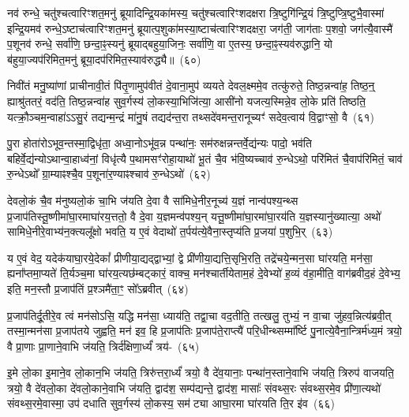 नव॑ रुन्धे॒ चतु॑श्चत्वारिꣳशत॒मनु॑ ब्रूयादिन्द्रि॒यका॑मस्य॒ चतु॑श्चत्वारिꣳशदक्षरा त्रि॒ष्टुगि॑न्द्रि॒यं त्रि॒ष्टुप्त्रि॒ष्टुभै॒वास्मा॑ इन्द्रि॒यमव॑ रुन्धे॒\-ऽष्टाच॑त्वारिꣳशत॒मनु॑ ब्रूयात्प॒शुका॑मस्या॒ष्टाच॑त्वारिꣳशदक्षरा॒ जग॑ती॒ जाग॑ताः प॒शवो॒ जग॑त्यै॒वास्मै॑ प॒शूनव॑ रुन्धे॒ सर्वा॑णि॒ छन्दा॒ꣴ॒स्यनु॑ ब्रूयाद्बहुया॒जिनः॒ सर्वा॑णि॒ वा ए॒तस्य॒ छन्दा॒ꣴ॒स्यव॑रुद्धानि॒ यो ब॑हुया॒ज्यप॑रिमित॒मनु॑ ब्रूया॒दप॑रिमित॒स्याव॑रुद्ध्यै॥~(६०)

{\anuvakamend[{का॒मये॑त॒ प्रति॑ष्ठित्यै प॒शून्थ्स॒प्तच॑त्वारिꣳशच्च}]}%

निवी॑तं मनु॒ष्या॑णां प्राचीनावी॒तं पि॑तृ॒णामुप॑वीतं दे॒वाना॒मुप॑ व्ययते देवल॒क्ष्ममे॒व तत्कु॑रुते॒ तिष्ठ॒न्नन्वा॑ह॒ तिष्ठ॒न्॒ ह्याश्रु॑ततरं॒ वद॑ति॒ तिष्ठ॒न्नन्वा॑ह सुव॒र्गस्य॑ लो॒कस्या॒भिजि॑त्या॒ आसी॑नो यजत्य॒स्मिन्ने॒व लो॒के प्रति॑ तिष्ठति॒ यत्क्रौ॒ञ्चम॒न्वाहा॑ऽऽसु॒रं तद्यन्म॒न्द्रं मा॑नु॒षं तद्यद॑न्त॒रा तथ्सदे॑वमन्त॒रानूच्यꣳ॑ सदेव॒त्वाय॑ वि॒द्वाꣳसो॒ वै~(६१)

पु॒रा होता॑रो\-ऽभूव॒न्तस्मा॒द्विधृ॑ता॒ अध्वा॒नो\-ऽभू॑व॒न्न पन्था॑नः॒ सम॑रुक्षन्नन्तर्वे॒द्य॑न्यः पादो॒ भव॑ति बहिर्वे॒द्य॑न्यो\-ऽथान्वा॒हाध्व॑नां॒ विधृ॑त्यै प॒थामसꣳ॑रोहा॒याथो॑ भू॒तं चै॒व भ॑वि॒ष्यच्चाव॑ रु॒न्धे\-ऽथो॒ परि॑मितं चै॒वाप॑रिमितं॒ चाव॑ रु॒न्धे\-ऽथो᳚ ग्रा॒म्याꣴश्चै॒व प॒शूना॑र॒ण्याꣴश्चाव॑ रु॒न्धे\-ऽथो॑~(६२)

देवलो॒कं चै॒व म॑नुष्यलो॒कं चा॒भि ज॑यति दे॒वा वै सा॑मिधे॒नीर॒नूच्य॑ य॒ज्ञं नान्व॑पश्य॒न्थ्स प्र॒जा\-प॑तिस्तू॒ष्णीमा॑घा॒र\-माघा॑र\-य॒त्ततो॒ वै दे॒वा य॒ज्ञमन्व॑पश्य॒न् यत्तू॒ष्णीमा॑\-घा॒रमा॑\-घा॒रय॑ति य॒ज्ञस्यानु॑\-ख्यात्या॒ अथो॑ सामिधे॒नीरे॒वाभ्य॑न॒क्त्यलू᳚क्षो भवति॒ य ए॒वं वेदाथो॑ त॒र्पय॑त्ये॒वैना॒स्तृप्य॑ति प्र॒जया॑ प॒शुभि॒र्~(६३)

य ए॒वं वेद॒ यदेक॑याघा॒रये॒देकां᳚ प्रीणीया॒द्यद्द्वाभ्यां॒ द्वे प्री॑णीया॒द्यत्ति॒सृभि॒रति॒ तद्रे॑चये॒न्मन॒सा घा॑रयति॒ मन॑सा॒ ह्यना᳚प्तमा॒प्यते॑ ति॒र्यञ्च॒मा घा॑रय॒त्यछ॑म्बट्कारं॒ वाक्च॒ मन॑श्चार्तीयेताम॒हं दे॒वेभ्यो॑ ह॒व्यं व॑हा॒मीति॒ वाग॑ब्रवीद॒हं दे॒वेभ्य॒ इति॒ मन॒स्तौ प्र॒जा\-प॑तिं प्र॒श्ञमै॑ता॒ꣳ॒ सो᳚\-ऽब्रवीत्~(६४)

प्र॒जा\-प॑तिर्दू॒तीरे॒व त्वं मन॑सो\-ऽसि॒ यद्धि मन॑सा॒ ध्याय॑ति॒ तद्वा॒चा वद॒तीति॒ तत्खलु॒ तुभ्यं॒ न वा॒चा जु॑हव॒न्नित्य॑ब्रवी॒त् तस्मा॒न्मन॑सा प्र॒जाप॑तये जुह्वति॒ मन॑ इव॒ हि प्र॒जा\-प॑तिः प्र॒जाप॑ते॒राप्त्यै॑ परि॒धीन्थ्सम्मा᳚र्ष्टि पु॒नात्ये॒वैना॒न्त्रिर्म॑ध्य॒मं त्रयो॒ वै प्रा॒णाः प्रा॒णाने॒वाभि ज॑यति॒ त्रिर्द॑क्षिणा॒र्ध्यं॑ त्रय॑-~(६५)

इ॒मे लो॒का इ॒माने॒व लो॒कान॒भि ज॑यति॒ त्रिरु॑त्तरा॒र्ध्यं॑ त्रयो॒ वै दे॑व॒यानाः॒ पन्था॑न॒स्ताने॒वाभि ज॑यति॒ त्रिरुप॑ वाजयति॒ त्रयो॒ वै दे॑वलो॒का दे॑वलो॒काने॒वाभि ज॑यति॒ द्वाद॑श॒ सम्प॑द्यन्ते॒ द्वाद॑श॒ मासाः᳚ संवथ्स॒रः सं॑वथ्स॒रमे॒व प्री॑णा॒त्यथो॑ संवथ्स॒रमे॒वास्मा॒ उप॑ दधाति सुव॒र्गस्य॑ लो॒कस्य॒ सम॑ट्या आघा॒रमा घा॑रयति ति॒र इ॑व~(६६)

